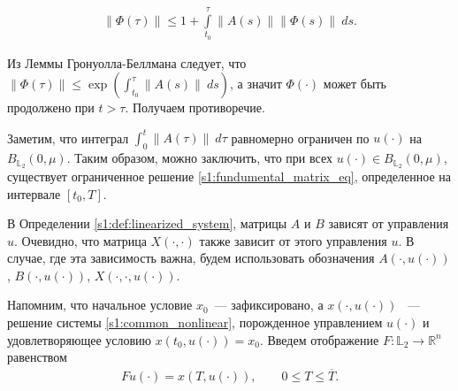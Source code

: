 \documentclass[../main.tex]{subfiles}
\begin{document}
\begin{gather*}
 \| \Phi(\tau) \| \leqslant 1 + \int\limits_{t_0}^{\tau} \| A(s)\| \|\Phi(s)\| \ ds.
\end{gather*}

Из Леммы Гронуолла-Беллмана следует, что $ \| \Phi(\tau) \| \leqslant \exp \left( \int_{t_0}^{\tau} \| A(s)\| \ ds \right)$, а значит $\Phi(\cdot)$ может быть продолжено при $t > \tau$. 
Получаем противоречие.

Заметим, что интеграл $\int_0^t \| A(\tau)\| \ d\tau$ равномерно ограничен по $u(\cdot) $ на $ B_{\mathbb{L}_2}(0,\mu)$.
Таким образом, можно заключить, что при всех $u(\cdot) \in B_{\mathbb{L}_2}(0,\mu)$, существует ограниченное решение \eqref{s1:fundumental_matrix_eq}, определенное на интервале $[t_0, T]$.

В Определении \ref{s1:def:linearized_system}, матрицы $A$ и $B$ зависят от управления $u$. 
Очевидно, что матрица $X(\cdot, \cdot)$ также зависит от этого управления $u$.
В случае, где эта зависимость важна, будем использовать обозначения $A(\cdot, u(\cdot))$, $B(\cdot, u(\cdot))$, $X(\cdot, \cdot, u(\cdot))$. 
 
 
Напомним, что начальное условие $x_0 $~--- зафиксировано, а $ x(\cdot,u(\cdot))$ ~--- решение системы \eqref{s1:common_nonlinear}, порожденное управлением $u(\cdot)$ и удовлетворяющее условию $x(t_0, u(\cdot)) = x_0$. 
Введем отображение $F: \mathbb{L}_2 \rightarrow \mathbb{R}^n $ равенством 
\begin{gather}\label{s1:solution_endpoint_mapping}
 Fu(\cdot) = x(T,u(\cdot)), \qquad 0 \leqslant T \leqslant \overline{T}.
\end{gather} 
 
\end{document}
